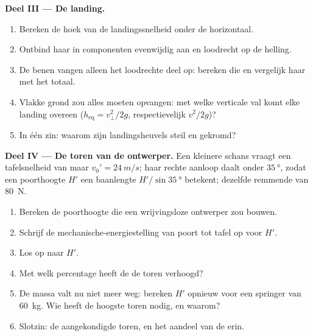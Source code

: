 \begin{problem}
\medskip\noindent\textbf{Deel III --- De landing.}
\begin{enumerate}[resume]
  \item Bereken de hoek van de landingssnelheid onder de horizontaal.
  \item Ontbind haar in componenten evenwijdig aan en loodrecht op de helling.
  \item De benen vangen alleen het loodrechte deel op: bereken die  en vergelijk haar met het totaal.
  \item Vlakke grond zou alles moeten opvangen: met welke verticale val komt
        elke landing overeen ($h_{\text{eq}} = v_\perp^2/2g$, respectievelijk
        $v^2/2g$)?
  \item In één zin: waarom zijn landingsheuvels steil en gekromd?
\end{enumerate}

\medskip\noindent\textbf{Deel IV --- De toren van de ontwerper.}
Een kleinere schans vraagt een tafelsnelheid van maar
$v_0' = \qty{24}{m/s}$; haar rechte aanloop daalt onder $\qty{35}{\degree}$,
zodat een poorthoogte $H'$ een baanlengte $H'/\sin\qty{35}{\degree}$ betekent;
dezelfde remmende  van \qty{80}{N}.
\begin{enumerate}[resume]
  \item Bereken de poorthoogte die een wrijvingsloze ontwerper zou bouwen.
  \item Schrijf de mechanische-energiestelling van poort tot tafel op voor
        $H'$.
  \item Los op naar $H'$.
  \item Met welk percentage heeft de  de toren verhoogd?
  \item De massa valt nu niet meer weg: bereken $H'$ opnieuw voor een springer
        van \qty{60}{kg}. Wie heeft de hoogste toren nodig, en waarom?
  \item Slotzin: de aangekondigde toren, en het aandeel van de  erin.
\end{enumerate}
\end{problem}
